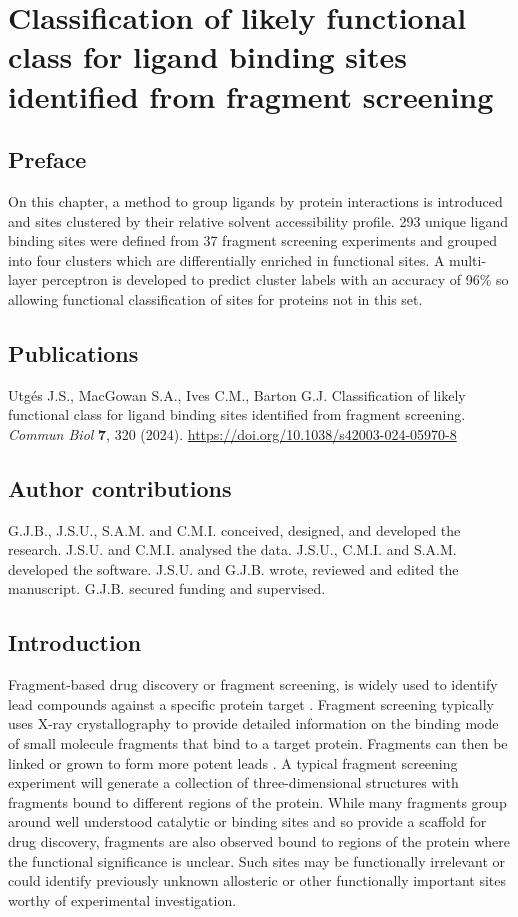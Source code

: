 \chapter{Classification of likely functional class for ligand binding sites identified from fragment screening}

\section*{Preface}

On this chapter, a method to group ligands by protein interactions is introduced and sites clustered by their relative solvent accessibility profile. 293 unique ligand binding sites were defined from 37 fragment screening experiments and grouped into four clusters which are differentially enriched in functional sites. A multi-layer perceptron is developed to predict cluster labels with an accuracy of 96\% so allowing functional classification of sites for proteins not in this set. 

\section*{Publications}

Utgés J.S., MacGowan S.A., Ives C.M., Barton G.J. Classification of likely functional class for ligand binding sites identified from fragment screening. \textit{Commun Biol} \textbf{7}, 320 (2024). \url{https://doi.org/10.1038/s42003-024-05970-8}

\section*{Author contributions}

G.J.B., J.S.U., S.A.M. and C.M.I. conceived, designed, and developed the research. J.S.U. and C.M.I. analysed the data. J.S.U., C.M.I. and S.A.M. developed the software. J.S.U. and G.J.B. wrote, reviewed and edited the manuscript. G.J.B. secured funding and supervised.

\section{Introduction}

Fragment-based drug discovery or fragment screening, is widely used to identify lead compounds against a specific protein target \cite{MURRAY_2009_FBDD}. Fragment screening typically uses X-ray crystallography to provide detailed information on the binding mode of small molecule fragments that bind to a target protein. Fragments can then be linked or grown to form more potent leads \cite{CONGREVE_2003_RO3, REES_2004_FBLD, SCHIEBEL_2016_FRAGMENTS}. A typical fragment screening experiment will generate a collection of three-dimensional structures with fragments bound to different regions of the protein. While many fragments group around well understood catalytic or binding sites and so provide a scaffold for drug discovery, fragments are also observed bound to regions of the protein where the functional significance is unclear. Such sites may be functionally irrelevant or could identify previously unknown allosteric or other functionally important sites worthy of experimental investigation. 

